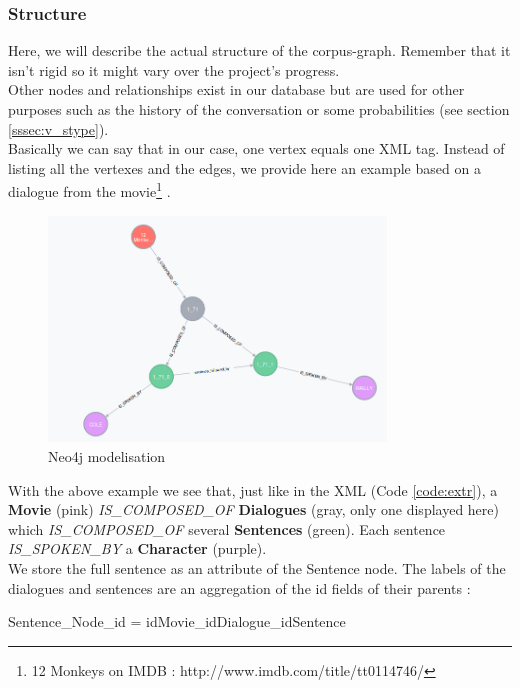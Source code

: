 \subsubsection{Structure}
Here, we will describe the actual structure of the corpus-graph. Remember that it isn't rigid so it might vary over the project's progress.\\
Other nodes and relationships exist in our database but are used for other purposes such as the history of the conversation or some probabilities (see section \ref{sssec:v_stype}).\\
Basically we can say that in our case, one vertex equals one XML tag. Instead of listing all the vertexes and the edges, we provide here an example based on a dialogue from the movie\footnote{12 Monkeys on IMDB : http://www.imdb.com/title/tt0114746/} .

\begin{figure}[!h]
\begin{center}
\includegraphics[width=0.8\textwidth]{./img/graph171.png}
\end{center}
\caption{Neo4j modelisation}
\label{fig:neoExtr}
\end{figure}
With the above example we see that, just like in the XML (Code \ref{code:extr}), a \textbf{Movie} (pink) \textit{IS\_COMPOSED\_OF} \textbf{Dialogues} (gray, only one displayed here) which \textit{IS\_COMPOSED\_OF} several \textbf{Sentences} (green). Each sentence \textit{IS\_SPOKEN\_BY} a \textbf{Character} (purple).\\
We store the full sentence as an attribute of the Sentence node. The labels of the dialogues and sentences are an aggregation of the id fields of their parents :
\begin{center}Sentence\_Node\_id = idMovie\_idDialogue\_idSentence \end{center}
